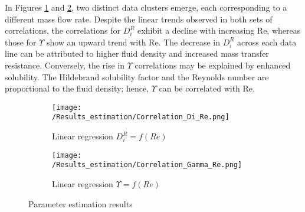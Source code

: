 \documentclass[../Supercritical_fluid_extraction_of_essential_oil_from_chamomile.tex]{subfiles}
\begin{document}
	In Figures \ref{fig: Correlations_Di_Re} and \ref{fig: Correlations_Gamma_Re}, two distinct data clusters emerge, each corresponding to a different mass flow rate. Despite the linear trends observed in both sets of correlations, the correlations for $D_i^R$ exhibit a decline with increasing Re, whereas those for $\Upsilon$ show an upward trend with Re. The decrease in $D_i^R$ across each data line can be attributed to higher fluid density and increased mass transfer resistance. Conversely, the rise in $\Upsilon$ correlations may be explained by enhanced solubility. The Hildebrand solubility factor and the Reynolds number are proportional to the fluid density; hence, $\Upsilon$ can be correlated with Re.
	
	\begin{figure}[!h]
		\centering
		\begin{subfigure}[b]{\columnwidth}
			\centering
			\texttt{[image: /Results\_estimation/Correlation\_Di\_Re.png]}
			\caption{Linear regression $D_i^R = f(Re)$}
			\label{fig: Correlations_Di_Re}
		\end{subfigure}
		\hfill
		\begin{subfigure}[b]{\columnwidth}
			\centering
			\texttt{[image: /Results\_estimation/Correlation\_Gamma\_Re.png]}
			\caption{Linear regression $\Upsilon = f(Re)$}
			\label{fig: Correlations_Gamma_Re}
		\end{subfigure}
		\caption{Parameter estimation results}
		\label{fig: Correlations}
	\end{figure}
	
\end{document}

